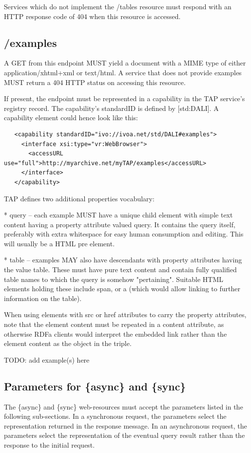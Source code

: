 \documentclass[11pt,a4paper]{ivoa}
\begin{document}
Services which do not implement the /tables resource must respond with an HTTP 
response code of 404 when this resource is accessed.

\subsection{/examples}
A GET from this endpoint MUST yield a document with a MIME type of either 
application/xhtml+xml or text/html. A service that does not provide examples 
MUST return a 404 HTTP status on accessing this resource.

If present, the endpoint must be represented in a capability in the TAP 
service's registry record. The capability's standardID is defined by 
[std:DALI]. A capability element could hence look like this:

\begin{verbatim}
   <capability standardID="ivo://ivoa.net/std/DALI#examples">
     <interface xsi:type="vr:WebBrowser">
       <accessURL use="full">http://myarchive.net/myTAP/examples</accessURL>
     </interface>
   </capability>
\end{verbatim}

TAP defines two additional properties vocabulary:

* query -- each example MUST have a unique child element with simple text 
content having a property attribute valued query. It contains the query itself, 
preferably with extra whitespace for easy human consumption and editing. This 
will usually be a HTML pre element.
    
* table -- examples MAY also have descendants with property attributes having 
the value table. These must have pure text content and contain fully qualified 
table names to which the query is somehow "pertaining". Suitable HTML elements 
holding these include span, or a (which would allow linking to further 
information on the table).

When using elements with src or href attributes to carry the property 
attributes, note that the element content must be repeated in a content 
attribute, as otherwise RDFa clients would interpret the embedded link rather 
than the element content as the object in the triple.

TODO: add example(s) here

\subsection{Parameters for \{async\} and \{sync\}}
The \{async\} and \{sync\} web-resources must accept the parameters listed in 
the following sub-sections. In a synchronous request, the parameters select the 
representation returned in the response message. In an asynchronous request, the 
parameters select the representation of the eventual query result rather than 
the response to the initial request.
\end{document}
